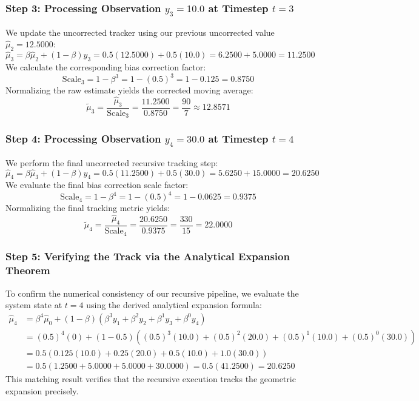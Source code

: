 \documentclass{article}
\begin{document}
\subsubsection{Step 3: Processing Observation $y_3 = 10.0$ at Timestep $t = 3$}
We update the uncorrected tracker using our previous uncorrected value $\hat{\mu}_2 = 12.5000$:
\begin{equation}
\hat{\mu}_3 = \beta \hat{\mu}_2 + (1 - \beta) y_3 = 0.5(12.5000) + 0.5(10.0) = 6.2500 + 5.0000 = \mathbf{11.2500}
\end{equation}
We calculate the corresponding bias correction factor:
\begin{equation}
\text{Scale}_3 = 1 - \beta^3 = 1 - (0.5)^3 = 1 - 0.125 = \mathbf{0.8750}
\end{equation}
Normalizing the raw estimate yields the corrected moving average:
\begin{equation}
\tilde{\mu}_3 = \frac{\hat{\mu}_3}{\text{Scale}_3} = \frac{11.2500}{0.8750} = \frac{90}{7} \approx \mathbf{12.8571}
\end{equation}

\subsubsection{Step 4: Processing Observation $y_4 = 30.0$ at Timestep $t = 4$}
We perform the final uncorrected recursive tracking step:
\begin{equation}
\hat{\mu}_4 = \beta \hat{\mu}_3 + (1 - \beta) y_4 = 0.5(11.2500) + 0.5(30.0) = 5.6250 + 15.0000 = \mathbf{20.6250}
\end{equation}
We evaluate the final bias correction scale factor:
\begin{equation}
\text{Scale}_4 = 1 - \beta^4 = 1 - (0.5)^4 = 1 - 0.0625 = \mathbf{0.9375}
\end{equation}
Normalizing the final tracking metric yields:
\begin{equation}
\tilde{\mu}_4 = \frac{\hat{\mu}_4}{\text{Scale}_4} = \frac{20.6250}{0.9375} = \frac{330}{15} = \mathbf{22.0000}
\end{equation}

\subsubsection{Step 5: Verifying the Track via the Analytical Expansion Theorem}
To confirm the numerical consistency of our recursive pipeline, we evaluate the system state at $t = 4$ using the derived analytical expansion formula:
\begin{align*}
\hat{\mu}_4 &= \beta^4 \hat{\mu}_0 + (1 - \beta) \left( \beta^3 y_1 + \beta^2 y_2 + \beta^1 y_3 + \beta^0 y_4 \right) \\
&= (0.5)^4(0) + (1 - 0.5) \left( (0.5)^3(10.0) + (0.5)^2(20.0) + (0.5)^1(10.0) + (0.5)^0(30.0) \right) \\
&= 0.5 \left( 0.125(10.0) + 0.25(20.0) + 0.5(10.0) + 1.0(30.0) \right) \\
&= 0.5 \left( 1.2500 + 5.0000 + 5.0000 + 30.0000 \right) = 0.5 \left( 41.2500 \right) = \mathbf{20.6250}
\end{align*}
This matching result verifies that the recursive execution tracks the geometric expansion precisely.
\end{document}
